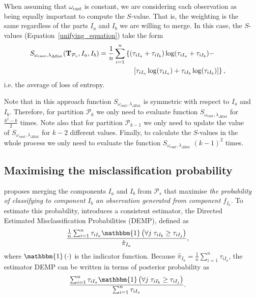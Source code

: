 \documentclass[submit]{smj}
\theoremstyle{definition}
\begin{document}
When assuming that $\omega_{\text{cnst}}$ is constant, we are considering each observation as being equally important to compute the $S$-value. That is, the weighting is the same regardless of the parts $I_a$ and $I_b$ we are willing to merge. In this case, the $S$-values (Equation~\ref{unifying_equation}) take the form
\[
\begin{split}
S_{\omega_{\text{cnst}}, \lambda_{\Delta\text{Ent}}}( \text{\textbf{T}}_{\mathcal{P}_s},  I_a,  I_b) = \frac{1}{n} \sum_{i=1}^n & \left\{(\tau_{iI_a}+\tau_{iI_b}) \log(\tau_{iI_a} + \tau_{iI_b}) - \right.\\ 
&\quad \left.\left[ \tau_{iI_a} \log(\tau_{iI_a}) + \tau_{iI_b} \log(\tau_{iI_b}) \right]\right\},
\end{split}
\]
i.e. the average of loss of entropy.

Note that in this approach function $S_{\omega_{\text{cnst}}, \lambda_{\Delta\text{Ent}}}$ is symmetric with respect to $I_a$ and $I_b$. Therefore, for partition $\mathcal{P}_k$ we only need to evaluate function $S_{\omega_{\text{cnst}}, \lambda_{\Delta\text{Ent}}}$ for $\frac{k^2-k}{2}$ times. Note also that for partition $\mathcal{P}_{k-1}$ we only need to update the value of $S_{\omega_{\text{cnst}}, \lambda_{\Delta\text{Ent}}}$ for $k-2$ different values. Finally, to calculate the $S$-values in the whole process we only need to evaluate the function $S_{\omega_{\text{cnst}}, \lambda_{\Delta\text{Ent}}}$ $(k-1)^2$ times. 

\subsection{Maximising the misclassification probability}
\label{missclassification_section}

\cite{hennig2010methods} proposes merging the components $I_a$ and $I_b$ from $ \mathcal{P}_s$ that maximise \emph{the probability of classifying to component $I_b$ an observation generated from component $f_{I_a}$}. To estimate this probability,  \cite{hennig2010methods} introduces a consistent estimator, the Directed Estimated Misclassification Probabilities (DEMP), defined as
\[
\frac{ \frac{1}{n} \sum_{i=1}^n {\tau_{iI_a} \mathbbm{1}\left( \forall j\; \tau_{i I_{b}} \geq \tau_{iI_j} \right)}}{ \hat{\pi}_{I_a}},
\]
where $\mathbbm{1}\left( \cdot \right)$ is the indicator function. Because $ \hat{\pi}_{I_a} = \frac{1}{n} \sum_{i=1}^n \tau_{iI_a}$, the estimator DEMP can be written in terms of posterior probability as
\begin{equation}\label{demp_criteria}
\frac{ \sum_{i=1}^n {\tau_{iI_a} \mathbbm{1}\left( \forall j\; \tau_{i I_{b}} \geq \tau_{iI_j} \right)}}{\sum_{i=1}^n \tau_{iI_a} }.
\end{equation}
\end{document}
